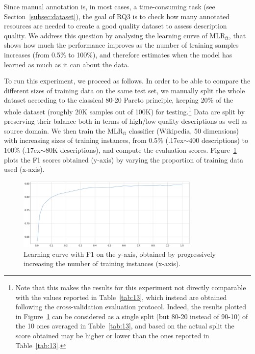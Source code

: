 \documentclass[epsfig,a4paper,12pt,titlepage]{book}
\newcommand{\mlr}{MLR$_\text{ft}$\xspace}
\newcommand{\mytilde}{\raise.17ex\hbox{$\scriptstyle\mathtt{\sim}$}}
\begin{document}
Since manual annotation is, in most cases, a time-con\-sum\-ing task (see  Section~\ref{subsec:dataset}), the goal of RQ3 is to check how many annotated resources are needed to create a good quality dataset to assess description quality. We address this question by analysing the learning curve of \mlr, that shows how much the performance improves as the number of training samples increases (from 0.5\% to 100\%), and therefore estimates when the model has learned as much as it can about the data.

To run this experiment, we proceed as follows. In order to be able to compare the different sizes of training data on the same test set, we manually split the whole dataset according to the classical 80-20 Pareto principle, keeping 20\% of the whole dataset (roughly 20K samples out of 100K) for testing.\footnote{Note that this makes the results for this experiment not directly comparable with the values reported in Table~\ref{tab:13}, which instead are obtained following the cross-validation evaluation protocol. Indeed, the results plotted in Figure~\ref{fig:3} can be considered as a single split (but 80-20 instead of 90-10) of the 10 ones averaged in Table~\ref{tab:13}, and based on the actual split the score obtained may be higher or lower than the ones reported in Table~\ref{tab:13}.} Data are split by preserving their balance both in terms of high/low-quality descriptions as well as source domain. We then train the \mlr classifier (Wikipedia, 50 dimensions) with increasing sizes of training instances, from 0.5\% (\mytilde400 descriptions) to 100\% (\mytilde80K descriptions), and compute the evaluation scores. Figure~\ref{fig:3} plots the F1 scores obtained (y-axis) by varying the proportion of training data used (x-axis).
    
	\begin{figure}[h]
		\center 
		\includegraphics[width=0.8\textwidth]{nowhitespace3.png}
		\caption{Learning curve with F1 on the y-axis, obtained by progressively increasing the number of training instances (x-axis).}
		\label{fig:3}       %
	\end{figure}
\end{document}
